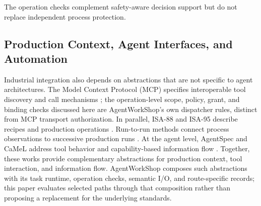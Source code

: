 The operation checks complement safety-aware decision support
\cite{jiang2026agentic} but do not replace independent process protection.

\subsection{Production Context, Agent Interfaces, and Automation}
Industrial integration also depends on abstractions that are not specific to
agent architectures. The Model Context Protocol (MCP) specifies interoperable
tool discovery and call mechanisms \cite{mcp2024}; the operation-level scope,
policy, grant, and binding checks discussed here are AgentWorkShop's own
dispatcher rules, distinct from MCP transport authorization. In parallel,
ISA-88 and ISA-95 describe recipes and production operations
\cite{isa88_2010,isa95_2025}. Run-to-run methods connect process observations
to successive production runs \cite{moyne2000r2r}. At the agent level,
AgentSpec and CaMeL address tool behavior and capability-based information
flow \cite{wang2025agentspec,debenedetti2025camel}. Together, these works
provide complementary abstractions for production context, tool interaction,
and information flow. AgentWorkShop composes such abstractions with its task
runtime, operation checks, semantic I/O, and route-specific records; this
paper evaluates selected paths through that composition rather than proposing
a replacement for the underlying standards.

